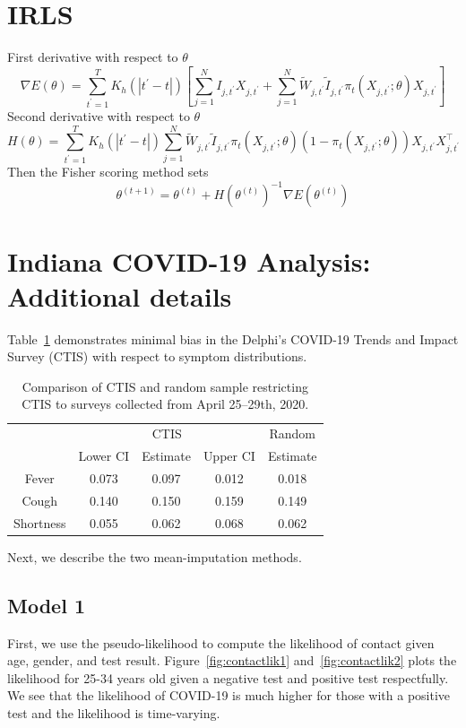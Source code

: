 \documentclass[11pt]{amsart}
\numberwithin{equation}{section}
\theoremstyle{plain}
\begin{document}
\section{IRLS}
\label{app:irls}
First derivative with respect to $\theta$
$$
\nabla E(\theta) = \sum_{t^\prime=1}^T K_h(|t^\prime - t|) \left[ \sum_{j=1}^N I_{j,t^\prime} X_{j,t^\prime} + \sum_{j=1}^N \tilde W_{j,t^\prime} \tilde I_{j,t^\prime} \pi_t (X_{j,t^\prime}; \theta) X_{j,t^\prime} \right]
$$
Second derivative with respect to $\theta$
$$
H(\theta) = \sum_{t^\prime=1}^T K_h(|t^\prime - t|) \sum_{j=1}^N \tilde W_{j,t^\prime} \tilde I_{j,t^\prime} \pi_t (X_{j,t^\prime}; \theta) \left( 1- \pi_t (X_{j,t^\prime}; \theta) \right) X_{j,t^\prime} X_{j,t^\prime}^\top
$$
Then the Fisher scoring method sets
$$
\theta^{(t+1)} = \theta^{(t)} + H \left(\theta^{(t)} \right)^{-1} \nabla E \left(\theta^{(t)} \right)
$$

\section{Indiana COVID-19 Analysis: Additional details}
\label{app:in_add_details}

Table~\ref{tab:comparison} demonstrates minimal bias in the Delphi’s COVID-19 Trends and Impact Survey (CTIS) with respect to symptom distributions.

 \begin{table}[!th]
 \centering
 \begin{tabular}{c | c c c | c}
 & \multicolumn{3}{c}{CTIS} & Random \\ \cline{2-4}
 & Lower CI & Estimate & Upper CI & Estimate \\ \hline
 Fever &  0.073 & 0.097 & 0.012 & 0.018 \\
 Cough &  0.140 & 0.150 & 0.159 & 0.149 \\
 Shortness & 0.055 & 0.062 & 0.068 & 0.062 \\ \hline
 \end{tabular}
 \caption{Comparison of CTIS and random sample restricting CTIS to surveys collected from April 25--29th, 2020.}
 \label{tab:comparison}
 \end{table}

Next, we describe the two mean-imputation methods.
\subsection{Model 1}

First, we use the pseudo-likelihood to compute the likelihood of contact given age, gender, and test result.  Figure~\ref{fig:contactlik1} and~\ref{fig:contactlik2} plots the likelihood for 25-34 years old given a negative test and positive test respectfully.  We see that the likelihood of COVID-19 is much higher for those with a positive test and the likelihood is time-varying.
\end{document}
